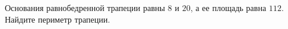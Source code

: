 \begin{ex}
	\begin{condition}
		Основания равнобедренной трапеции равны \( 8  \) и \( 20 \), а ее площадь равна \( 112 \). Найдите периметр трапеции.
	\end{condition}
\end{ex}